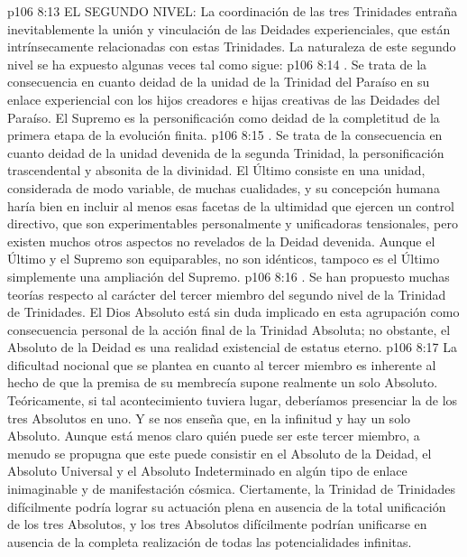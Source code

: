 \vs p106 8:13 \pc EL SEGUNDO NIVEL: La coordinación de las tres Trinidades entraña inevitablemente la unión y vinculación de las Deidades experienciales, que están intrínsecamente relacionadas con estas Trinidades. La naturaleza de este segundo nivel se ha expuesto algunas veces tal como sigue:
\vs p106 8:14 . Se trata de la consecuencia en cuanto deidad de la unidad de la Trinidad del Paraíso en su enlace experiencial con los hijos creadores e hijas creativas de las Deidades del Paraíso. El Supremo es la personificación como deidad de la completitud de la primera etapa de la evolución finita.
\vs p106 8:15 . Se trata de la consecuencia en cuanto deidad de la unidad devenida de la segunda Trinidad, la personificación trascendental y absonita de la divinidad. El Último consiste en una unidad, considerada de modo variable, de muchas cualidades, y su concepción humana haría bien en incluir al menos esas facetas de la ultimidad que ejercen un control directivo, que son experimentables personalmente y unificadoras tensionales, pero existen muchos otros aspectos no revelados de la Deidad devenida. Aunque el Último y el Supremo son equiparables, no son idénticos, tampoco es el Último simplemente una ampliación del Supremo.
\vs p106 8:16 . Se han propuesto muchas teorías respecto al carácter del tercer miembro del segundo nivel de la Trinidad de Trinidades. El Dios Absoluto está sin duda implicado en esta agrupación como consecuencia personal de la acción final de la Trinidad Absoluta; no obstante, el Absoluto de la Deidad es una realidad existencial de estatus eterno.
\vs p106 8:17 La dificultad nocional que se plantea en cuanto al tercer miembro es inherente al hecho de que la premisa de su membrecía supone realmente un solo Absoluto. Teóricamente, si tal acontecimiento tuviera lugar, deberíamos presenciar la  de los tres Absolutos en uno. Y se nos enseña que, en la infinitud y  hay un solo Absoluto. Aunque está menos claro quién puede ser este tercer miembro, a menudo se propugna que este puede consistir en el Absoluto de la Deidad, el Absoluto Universal y el Absoluto Indeterminado en algún tipo de enlace inimaginable y de manifestación cósmica. Ciertamente, la Trinidad de Trinidades difícilmente podría lograr su actuación plena en ausencia de la total unificación de los tres Absolutos, y los tres Absolutos difícilmente podrían unificarse en ausencia de la completa realización de todas las potencialidades infinitas.
